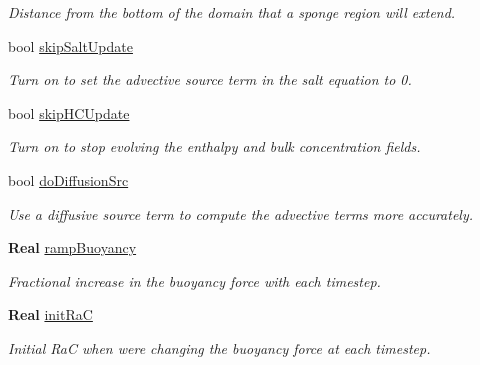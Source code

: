 \begin{DoxyCompactItemize}
\begin{DoxyCompactList}\small\item\em Distance from the bottom of the domain that a sponge region will extend. \end{DoxyCompactList}\item 
\mbox{\label{struct_mushy_layer_options_a5e60e50aa308b9dd73f46be0665b1bc0}} 
bool \hyperlink{struct_mushy_layer_options_a5e60e50aa308b9dd73f46be0665b1bc0}{skip\+Salt\+Update}
\begin{DoxyCompactList}\small\item\em Turn on to set the advective source term in the salt equation to 0. \end{DoxyCompactList}\item 
\mbox{\label{struct_mushy_layer_options_a0e87171dbf29e4b081192dae579248ff}} 
bool \hyperlink{struct_mushy_layer_options_a0e87171dbf29e4b081192dae579248ff}{skip\+H\+C\+Update}
\begin{DoxyCompactList}\small\item\em Turn on to stop evolving the enthalpy and bulk concentration fields. \end{DoxyCompactList}\item 
bool \hyperlink{struct_mushy_layer_options_a0631b4a1d95690c036da9a09d6042aa8}{do\+Diffusion\+Src}
\begin{DoxyCompactList}\small\item\em Use a diffusive source term to compute the advective terms more accurately. \end{DoxyCompactList}\item 
\mbox{\label{struct_mushy_layer_options_a8fc6447bcbc0bba62f5534dd70c0c770}} 
\textbf{ Real} \hyperlink{struct_mushy_layer_options_a8fc6447bcbc0bba62f5534dd70c0c770}{ramp\+Buoyancy}
\begin{DoxyCompactList}\small\item\em Fractional increase in the buoyancy force with each timestep. \end{DoxyCompactList}\item 
\mbox{\label{struct_mushy_layer_options_ac5c93d9ef6515f392f5de7d30cac9bbe}} 
\textbf{ Real} \hyperlink{struct_mushy_layer_options_ac5c93d9ef6515f392f5de7d30cac9bbe}{init\+RaC}
\begin{DoxyCompactList}\small\item\em Initial RaC when we\textquotesingle{}re changing the buoyancy force at each timestep. \end{DoxyCompactList}\item 

\end{DoxyCompactItemize}
